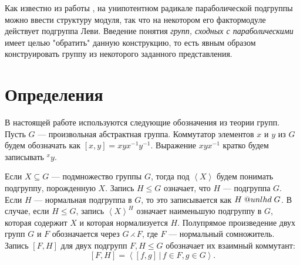 \documentclass[12pt]{matmex-diploma}
\makeatletter
\newcommand{\slunlhd}{%
  \mathrel{\mathpalette\sl@unlhd\relax}%
}
\newcommand{\sl@unlhd}[2]{%
  \sbox\z@{$#1\lhd$}%
  \sbox\tw@{$#1\leqslant$}%
  \dimen@=\ht\tw@
  \advance\dimen@-\ht\z@
  \ifx#1\displaystyle
    \advance\dimen@ .2pt
  \else
    \ifx#1\textstyle
      \advance\dimen@ .2pt
    \fi
  \fi
  \ooalign{\raisebox{\dimen@}{$\m@th#1\lhd$}\cr$\m@th#1\leqslant$\cr}%
}
\theoremstyle{mystyleni}
\theoremstyle{mystyle}
\newtheorem{definition}{Определение}
\renewcommand{\le}{\leqslant}
\renewcommand{\trianglelefteq}{\slunlhd}
\makeatother
\begin{document}
Как известно из работы \citep{Azad1990}, на унипотентном радикале параболической подгруппы можно ввести структуру модуля, так что на некотором его фактормодуле действует подгруппа Леви. Введение понятия \emph{групп, сходных с параболическими} имеет целью "обратить" данную конструкцию, то есть явным образом конструировать группу из некоторого заданного представления.

\pagebreak
\section{Определения}

\begin{comment}
Следующие три определения широко известны и приведены, например, в работах \cite{Conrad11reductivegroup}, \#, \#.
\begin{definition} 
Редуктивной $R$-группой называется линейная алгебраическая $R$-группа, не содержащая нетривиальных связных нормальных унипотентных линейных алгебраических $R$-подгрупп.
\end{definition}

\begin{definition}
Полупростой $R$-группой называется линейная алгебраическая $R$-группа, не содержащая нетривиальных связных нормальных разрешимых линейных алгебраических $R$-подгрупп.
\end{definition}

\begin{definition}
Простой $R$-группой называется линейная алгебраическая $R$-группа, не содержащая нетривиальных связных нормальных линейных алгебраических $R$-подгрупп.
\end{definition}
\end{comment}

В настоящей работе используются следующие обозначения из теории групп.\linebreak
Пусть $G$ --- произвольная абстрактная группа. Коммутатор элементов $x$ и $y$ из $G$ будем обозначать как $[x,y]=x y x^{-1} y^{-1}$.
Выражение $x y x^{-1}$ кратко будем записывать ${}^x y$.

Если $X \subseteq G$ --- подмножество группы $G$, тогда под $\left<X\right>$ будем понимать подгруппу, порожденную $X$.
Запись $H\le G$ означает, что $H$ --- подгруппа $G$.
Если $H$ --- нормальная подгруппа в $G$, то это записывается как $H \trianglelefteq G$. В случае, если $H \le G$, запись $\left<X\right>^H$ означает наименьшую подгруппу в $G$, которая содержит $X$ и которая нормализуется $H$.
Полупрямое произведение двух групп $G$ и $F$ обозначается через $G\rightthreetimes F$, где $F$ --- нормальный сомножитель.
Запись $[F,H]$ для двух подгрупп $F,H \le G$ обозначает их взаимный коммутант:
$$ [F,H] = \left<[f,g] \, | \, f\in F, g \in G \right> .$$
\end{document}
